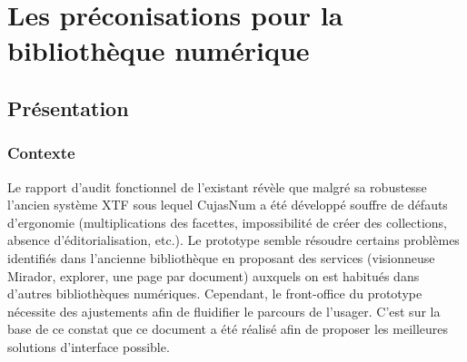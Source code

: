 \chapter{Les préconisations pour la bibliothèque numérique}
\label{annexe_B_preconisations}

\section{Présentation}
\subsection{Contexte}
Le rapport d’audit fonctionnel de l’existant révèle que malgré sa robustesse l’ancien système XTF sous lequel CujasNum a été développé souffre de défauts d’ergonomie (multiplications des facettes, impossibilité de créer des collections, absence d’éditorialisation, etc.). Le prototype semble résoudre certains problèmes identifiés dans l’ancienne bibliothèque en proposant des services (visionneuse Mirador, explorer, une page par document) auxquels on est habitués dans d’autres bibliothèques numériques. Cependant, le front-office du prototype nécessite des ajustements afin de fluidifier le parcours de l’usager. C’est sur la base de ce constat que ce document a été réalisé afin de proposer les meilleures solutions d’interface possible.

